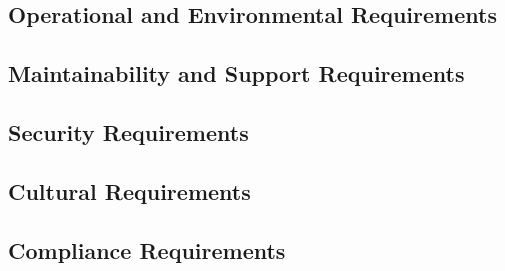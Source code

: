 \documentclass[12pt]{article}
\begin{document}
\subsection{Operational and Environmental Requirements}
\subsection{Maintainability and Support Requirements}
\subsection{Security Requirements}
\subsection{Cultural Requirements}
\subsection{Compliance Requirements}
\end{document}
